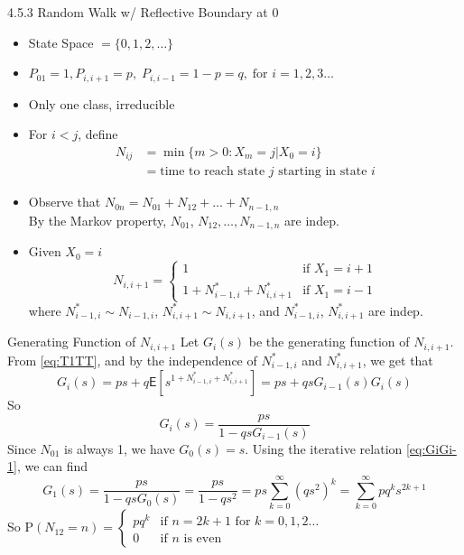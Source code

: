 \documentclass[letterpaper, mathserif]{beamer}
\def\p{\mathrm P}
\def\E{\mathsf E}
\begin{document}
\begin{frame}{4.5.3 Random Walk w/ Reflective Boundary at 0}
\begin{itemize}
\item State Space $=\{0,1,2,\ldots\}$
\item $P_{01}=1, P_{i,i+1}=p, \;P_{i,i-1}=1-p=q,\;\text{for } i=1,2,3\ldots$
\item Only one class, irreducible
\item For $i<j$, define
\begin{align*}
N_{ij}&=\min\{m> 0: X_m=j|X_0=i\}\\
&=\text{time to reach state $j$ starting in state $i$}
\end{align*}
\item Observe that $N_{0n}=N_{01}+N_{12}+\ldots+N_{n-1,n}$\\
By the Markov property, $N_{01}$, $N_{12},\ldots,N_{n-1,n}$ are indep.
\item Given $X_0=i$
\begin{equation}\label{eq:T1TT}
N_{i,i+1}=
\begin{cases}
1 & \text{if } X_1=i+1\\
1 + N^{*}_{i-1,i}+ N^{*}_{i,i+1} &\text{if } X_1=i-1
\end{cases}
\end{equation}
where $N^{*}_{i-1,i}\sim N_{i-1,i}$, $N^{*}_{i,i+1}\sim N_{i,i+1}$, and $N^{*}_{i-1,i}$, $N^{*}_{i,i+1}$ are indep.
\end{itemize}
\end{frame}
\begin{frame}{Generating Function of $N_{i,i+1}$}
Let $G_{i}(s)$ be the generating function of $N_{i,i+1}$. From \eqref{eq:T1TT},
and by the independence of $N^{*}_{i-1,i}$ and $N^{*}_{i,i+1}$, we get that
$$
G_{i}(s)=ps+q \E[s^{1 + N^{*}_{i-1,i}+ N^{*}_{i,i+1}}]=ps+qsG_{i-1}(s)G_{i}(s)
$$
So
\begin{equation}\label{eq:GiGi-1}
G_i(s)=\frac{ps}{1-qsG_{i-1}(s)}
\end{equation}
Since $N_{01}$ is always 1, we have $G_0(s)=s$. Using the iterative relation \eqref{eq:GiGi-1}, we can find
$$
G_1(s) = \frac{ps}{1-qsG_0(s)}=\frac{ps}{1-qs^2}=ps\sum_{k=0}^{\infty}(qs^2)^k=\sum_{k=0}^{\infty}pq^ks^{2k+1}
$$
So
$\displaystyle
\p(N_{12}=n)
=\begin{cases}
pq^k & \text{if $n=2k+1$ for } k=0,1,2\ldots\\
0    & \text{if $n$ is even}
\end{cases}
$
\end{frame}
\end{document}
